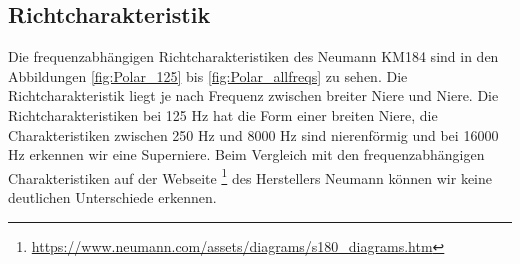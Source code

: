 \subsection{Richtcharakteristik}
Die frequenzabhängigen Richtcharakteristiken des Neumann KM184 sind in den Abbildungen \ref{fig:Polar_125} bis \ref{fig:Polar_allfreqs} zu sehen.
Die Richtcharakteristik liegt je nach Frequenz zwischen breiter Niere und Niere. 
Die Richtcharakteristiken bei 125 Hz hat die Form einer breiten Niere, die Charakteristiken zwischen 250 Hz und 8000 Hz sind nierenförmig und bei 16000 Hz erkennen wir eine Superniere.
Beim Vergleich mit den frequenzabhängigen Charakteristiken auf der Webseite \footnote{\url{https://www.neumann.com/assets/diagrams/s180_diagrams.htm}} des Herstellers Neumann können wir keine deutlichen Unterschiede erkennen.

